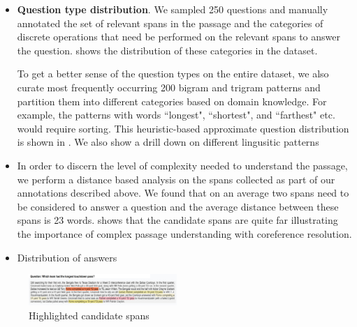 \begin{itemize}
    \item \textbf{Question type distribution}.
        \subitem We sampled 250 questions and manually annotated the set of relevant spans in the passage and the categories of discrete operations that need be performed on the relevant spans to answer the question.  shows the distribution of these categories in the dataset.
    
        \subitem To get a better sense of the question types on the entire dataset, we also curate most frequently occurring 200 bigram and trigram patterns and partition them into different categories based on domain knowledge. For example, the patterns with words ``longest", ``shortest", and ``farthest" etc. would require sorting. This heuristic-based approximate question distribution is shown in . We also show a drill down on different lingusitic patterns
   
   \item In order to discern the level of complexity needed to understand the passage, we perform a distance based analysis on the spans collected as part of our annotations described above. We found that on an average two spans need to be considered to answer a question and the average distance between these spans is 23 words.  shows that the candidate spans are quite far illustrating the importance of complex passage understanding with coreference resolution.
  
  \item Distribution of answers
\end{itemize}

\begin{figure}
    \centering
    \includegraphics[width=0.5\textwidth]{images/highlights_sort.png}
    \caption{Highlighted candidate spans}
    \label{fig:span_highlight}
\end{figure}
